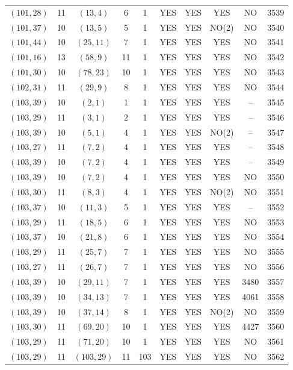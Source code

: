 \begin{longtable}{|c|c|c|c|c|c|c|c|c|c|}
$(101, 28)$ & 11 & $(13, 4)$ & 6 & 1 & YES & YES & YES & NO & 3539\\
$(101, 37)$ & 10 & $(13, 5)$ & 5 & 1 & YES & YES & NO(2) & NO & 3540\\
$(101, 44)$ & 10 & $(25, 11)$ & 7 & 1 & YES & YES & YES & NO & 3541\\
$(101, 16)$ & 13 & $(58, 9)$ & 11 & 1 & YES & YES & YES & NO & 3542\\
$(101, 30)$ & 10 & $(78, 23)$ & 10 & 1 & YES & YES & YES & NO & 3543\\
$(102, 31)$ & 11 & $(29, 9)$ & 8 & 1 & YES & YES & YES & NO & 3544\\
$(103, 39)$ & 10 & $(2, 1)$ & 1 & 1 & YES & YES & YES & -- & 3545\\
$(103, 29)$ & 11 & $(3, 1)$ & 2 & 1 & YES & YES & YES & -- & 3546\\
$(103, 39)$ & 10 & $(5, 1)$ & 4 & 1 & YES & YES & NO(2) & -- & 3547\\
$(103, 27)$ & 11 & $(7, 2)$ & 4 & 1 & YES & YES & YES & -- & 3548\\
$(103, 39)$ & 10 & $(7, 2)$ & 4 & 1 & YES & YES & YES & -- & 3549\\
$(103, 39)$ & 10 & $(7, 2)$ & 4 & 1 & YES & YES & YES & NO & 3550\\
$(103, 30)$ & 11 & $(8, 3)$ & 4 & 1 & YES & YES & NO(2) & NO & 3551\\
$(103, 37)$ & 10 & $(11, 3)$ & 5 & 1 & YES & YES & YES & -- & 3552\\
$(103, 29)$ & 11 & $(18, 5)$ & 6 & 1 & YES & YES & YES & NO & 3553\\
$(103, 37)$ & 10 & $(21, 8)$ & 6 & 1 & YES & YES & YES & NO & 3554\\
$(103, 29)$ & 11 & $(25, 7)$ & 7 & 1 & YES & YES & YES & NO & 3555\\
$(103, 27)$ & 11 & $(26, 7)$ & 7 & 1 & YES & YES & YES & NO & 3556\\
$(103, 39)$ & 10 & $(29, 11)$ & 7 & 1 & YES & YES & YES & 3480 & 3557\\
$(103, 39)$ & 10 & $(34, 13)$ & 7 & 1 & YES & YES & YES & 4061 & 3558\\
$(103, 39)$ & 10 & $(37, 14)$ & 8 & 1 & YES & YES & NO(2) & NO & 3559\\
$(103, 30)$ & 11 & $(69, 20)$ & 10 & 1 & YES & YES & YES & 4427 & 3560\\
$(103, 29)$ & 11 & $(71, 20)$ & 10 & 1 & YES & YES & YES & NO & 3561\\
$(103, 29)$ & 11 & $(103, 29)$ & 11 & 103 & YES & YES & YES & NO & 3562\\

\end{longtable}
